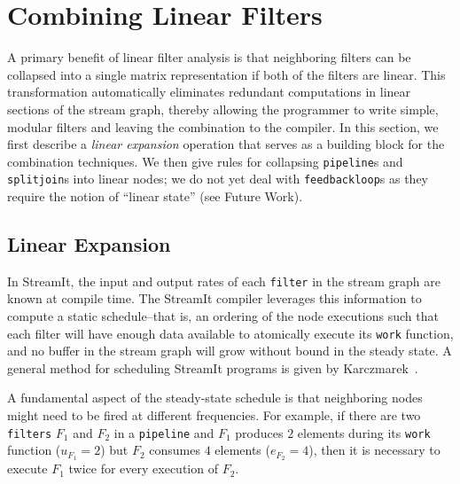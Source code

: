 \section{Combining Linear Filters}
A primary benefit of linear filter analysis is that neighboring
filters can be collapsed into a single matrix representation if both
of the filters are linear.  This transformation automatically
eliminates redundant computations in linear sections of the stream
graph, thereby allowing the programmer to write simple, modular
filters and leaving the combination to the compiler.  In this section,
we first describe a {\it linear expansion} operation that serves as a
building block for the combination techniques.  We then give rules for
collapsing {\tt pipeline}s and {\tt splitjoin}s into linear nodes; we
do not yet deal with {\tt feedbackloop}s as they require the notion of
``linear state'' (see Future Work).

\subsection{Linear Expansion}

In StreamIt, the input and output rates of each {\tt filter} in the
stream graph are known at compile time.  The StreamIt compiler
leverages this information to compute a static schedule--that is, an
ordering of the node executions such that each filter will have enough
data available to atomically execute its {\tt work} function, and no
buffer in the stream graph will grow without bound in the steady
state.  A general method for scheduling StreamIt programs is given by
Karczmarek~\cite{karczma-thesis}.

A fundamental aspect of the steady-state schedule is that neighboring
nodes might need to be fired at different frequencies.  For example,
if there are two {\tt filters} $F_1$ and $F_2$ in a {\tt pipeline} and
$F_1$ produces $2$ elements during its {\tt work} function
($u_{F_1}=2$) but $F_2$ consumes $4$ elements ($e_{F_2}=4$), then it
is necessary to execute $F_1$ twice for every execution of $F_2$.


